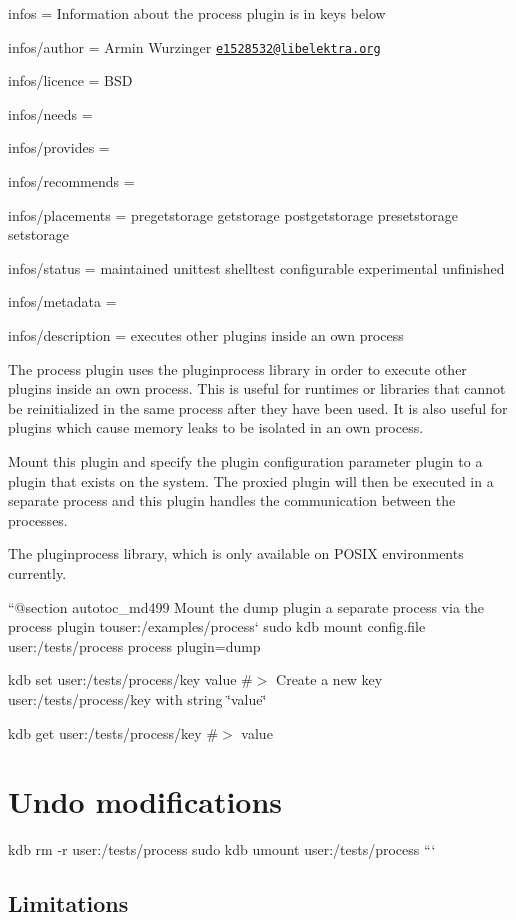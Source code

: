 
\begin{DoxyItemize}
\item infos = Information about the process plugin is in keys below
\item infos/author = Armin Wurzinger \href{mailto:e1528532@libelektra.org}{\tt e1528532@libelektra.\+org}
\item infos/licence = B\+SD
\item infos/needs =
\item infos/provides =
\item infos/recommends =
\item infos/placements = pregetstorage getstorage postgetstorage presetstorage setstorage
\item infos/status = maintained unittest shelltest configurable experimental unfinished
\item infos/metadata =
\item infos/description = executes other plugins inside an own process
\end{DoxyItemize}

The process plugin uses the {\ttfamily pluginprocess} library in order to execute other plugins inside an own process. This is useful for runtimes or libraries that cannot be reinitialized in the same process after they have been used. It is also useful for plugins which cause memory leaks to be isolated in an own process.

Mount this plugin and specify the plugin configuration parameter {\ttfamily plugin} to a plugin that exists on the system. The proxied plugin will then be executed in a separate process and this plugin handles the communication between the processes.

The {\ttfamily pluginprocess} library, which is only available on P\+O\+S\+IX environments currently.

``{\ttfamily  @section autotoc\+\_\+md499 Mount the dump plugin a separate process via the process plugin to}user\+:/examples/process` sudo kdb mount config.\+file user\+:/tests/process process plugin=dump

kdb set user\+:/tests/process/key value \#$>$ Create a new key user\+:/tests/process/key with string \char`\"{}value\char`\"{}

kdb get user\+:/tests/process/key \#$>$ value\hypertarget{autotoc_md495_autotoc_md500}{}\section{Undo modifications}\label{autotoc_md495_autotoc_md500}
kdb rm -\/r user\+:/tests/process sudo kdb umount user\+:/tests/process ```\hypertarget{autotoc_md495_autotoc_md501}{}\subsection{Limitations}\label{autotoc_md495_autotoc_md501}

